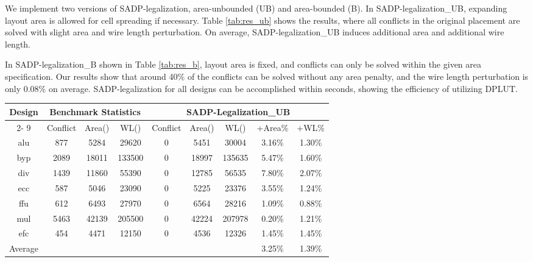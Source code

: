 We implement two versions of SADP-legalization, area-unbounded (UB) and area-bounded (B). In SADP-legalization\_UB, expanding layout area is allowed for cell spreading if necessary. Table \ref{tab:res_ub} shows the results, where all conflicts in the original placement are solved with slight area and wire length perturbation. On average, SADP-legalization\_UB induces  additional area and  additional wire length.

In SADP-legalization\_B shown in Table \ref{tab:res_b}, layout area is fixed, and conflicts can only be solved within the given area specification. Our results show that around 40\% of the conflicts can be solved without any area penalty, and the wire length perturbation is only 0.08\% on average. SADP-legalization for all designs can be accomplished within seconds, showing the efficiency of utilizing DPLUT.


\begin{table*}[htbp]
\caption{Experimental results with area-unbounded SADP legalization.}
\begin{center}
\begin{tabular}{c|ccc|ccccc}
\hline
\multicolumn{ 1}{c|}{Design} & \multicolumn{ 3}{c|}{Benchmark Statistics} & \multicolumn{ 5}{c}{SADP-Legalization\_UB} \\ \cline{ 2- 9}
\multicolumn{ 1}{c|}{} & Conflict & Area() & WL() & Conflict & Area() & WL() & +Area\% & +WL\% \\ \hline
alu & 877 & 5284 & 29620 & 0 & 5451 & 30004 & 3.16\% & 1.30\% \\
byp & 2089 & 18011 & 133500 & 0 & 18997 & 135635 & 5.47\% & 1.60\% \\
div & 1439 & 11860 & 55390 & 0 & 12785 & 56535 & 7.80\% & 2.07\% \\ 
ecc & 587 & 5046 & 23090 & 0 & 5225 & 23376 & 3.55\% & 1.24\% \\
ffu & 612 & 6493 & 27970 & 0 & 6564 & 28216 & 1.09\% & 0.88\% \\ 
mul & 5463 & 42139 & 205500 & 0 & 42224 & 207978 & 0.20\% & 1.21\% \\ 
efc & 454 & 4471 & 12150 & 0 & 4536 & 12326 & 1.45\% & 1.45\% \\ \hline
Average &  &  &  &  &  &  & 3.25\% & 1.39\% \\ \hline
\end{tabular}
\end{center}
\label{tab:res_ub}
\end{table*}

